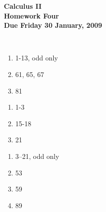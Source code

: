\documentclass[12pt]{article}
\begin{document}
\pagestyle{empty}
 
\begin{center}
{\large {\bf Calculus II}}\\
\medskip
{\large {\bf Homework Four}}\\
\medskip
{ {\bf Due Friday 30 January, 2009}}\\
\end{center}
\hspace{2mm}\\

\begin{enumerate}
\setlength{\itemsep}{-1mm}
  \item 1-13, odd only
  \item 61, 65, 67
  \item 81
\end{enumerate}


\begin{enumerate}
\setlength{\itemsep}{-1mm}
  \item 1-3
  \item 15-18
  \item 21
\end{enumerate}



\begin{enumerate}
\setlength{\itemsep}{-1mm}
  \item 3--21, odd only
  \item 53
  \item 59
  \item 89

\end{enumerate}

%


%
%


%
%
\end{document}
